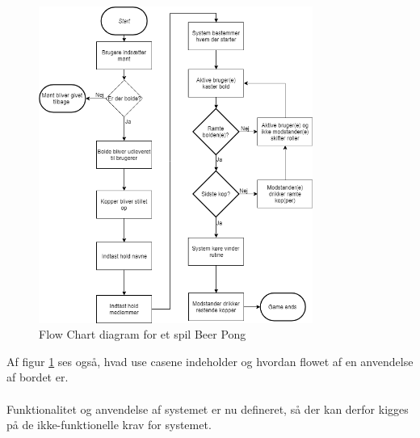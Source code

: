 \documentclass[Rapport/Rapport_main.tex]{subfiles}
\begin{document}
\begin{figure}[H]
    \centering
    \includegraphics[width=0.8\textwidth]{Kravspecifikation/Flowchart/pics/Beerpongflowchart.png}
    \caption{Flow Chart diagram for et spil Beer Pong}
    \label{fig:rap_beer_pong_flow}
\end{figure}
Af figur \ref{fig:rap_beer_pong_flow} ses også, hvad use casene indeholder og hvordan flowet af en anvendelse af bordet er.\\\\
Funktionalitet og anvendelse af systemet er nu defineret, så der kan derfor kigges på de ikke-funktionelle krav for systemet.
\end{document}
